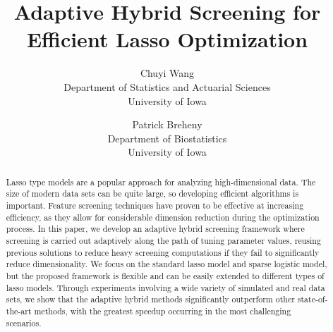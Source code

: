 \documentclass{article}
\title{Adaptive Hybrid Screening for Efficient Lasso Optimization}
\author{Chuyi Wang\\Department of Statistics and Actuarial Sciences\\University of Iowa
  \and
  Patrick Breheny\\Department of Biostatistics\\University of Iowa}
\date{}
\begin{document}
\maketitle

\begin{abstract}
Lasso type models are a popular approach for analyzing high-dimensional data. The size of modern data sets can be quite large, so developing efficient algorithms is important. Feature screening techniques have proven to be effective at increasing efficiency, as they allow for considerable dimension reduction during the optimization process. In this paper, we develop an adaptive hybrid screening framework where screening is carried out adaptively along the path of tuning parameter values, reusing previous solutions to reduce heavy screening computations if they fail to significantly reduce dimensionality. We focus on the standard lasso model and sparse logistic model, but the proposed framework is flexible and can be easily extended to different types of lasso models. Through experiments involving a wide variety of simulated and real data sets, we show that the adaptive hybrid methods significantly outperform other state-of-the-art methods, with the greatest speedup occurring in the most challenging scenarios.
\end{abstract}





\newpage


\end{document}
